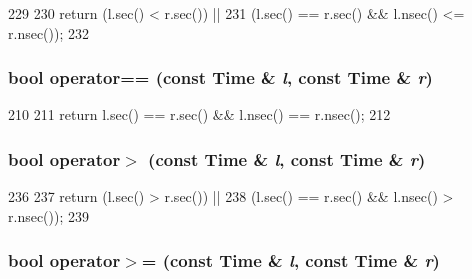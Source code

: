 \begin{DoxyCode}
229 {
230     return (l.sec() < r.sec()) ||
231         (l.sec() == r.sec() && l.nsec() <= r.nsec());
232 }
\end{DoxyCode}
\hypertarget{time_8hh_a3176ef1cd16508b8339ff1581f967806}{
\subsubsection[{operator==}]{\setlength{\rightskip}{0pt plus 5cm}bool operator== (const {\bf Time} \& {\em l}, \/  const {\bf Time} \& {\em r})}}
\label{time_8hh_a3176ef1cd16508b8339ff1581f967806}



\begin{DoxyCode}
210 {
211     return l.sec() == r.sec() && l.nsec() == r.nsec();
212 }
\end{DoxyCode}
\hypertarget{time_8hh_a3bf3ca2cebac73aa9ff847cbbe3f8b90}{
\subsubsection[{operator$>$}]{\setlength{\rightskip}{0pt plus 5cm}bool operator$>$ (const {\bf Time} \& {\em l}, \/  const {\bf Time} \& {\em r})}}
\label{time_8hh_a3bf3ca2cebac73aa9ff847cbbe3f8b90}



\begin{DoxyCode}
236 {
237     return (l.sec() > r.sec()) ||
238         (l.sec() == r.sec() && l.nsec() > r.nsec());
239 }
\end{DoxyCode}
\hypertarget{time_8hh_a0172fc54dac3024b7291cb7674ccd01f}{
\subsubsection[{operator$>$=}]{\setlength{\rightskip}{0pt plus 5cm}bool operator$>$= (const {\bf Time} \& {\em l}, \/  const {\bf Time} \& {\em r})}}
\label{time_8hh_a0172fc54dac3024b7291cb7674ccd01f}



